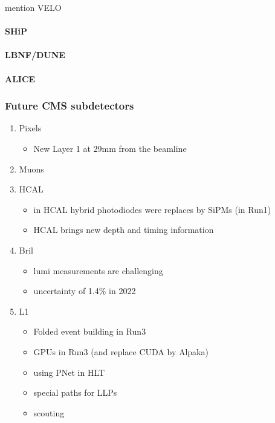 \documentclass[11pt]{article}
\begin{document}
mention VELO

\cite{lhcb_hllhc_tdr,lhcb_hllhc_interest}

\paragraph{SHiP}

\paragraph{LBNF/DUNE}

\paragraph{ALICE}
\subsubsection{Future CMS subdetectors}
\label{sec:org8a7fac8}
\label{sec:hllhc_future_subdetectors.org}
\begin{enumerate}
\item Pixels
\label{sec:orge3f4508}
\begin{itemize}
\item New Layer 1 at 29mm from the beamline
\end{itemize}
\item Muons
\label{sec:orgd4053de}
\item HCAL
\label{sec:orgc5f29ad}
\begin{itemize}
\item in HCAL hybrid photodiodes were replaces by SiPMs (in Run1)
\item HCAL brings new depth and timing information
\end{itemize}
\item Bril
\label{sec:org3b27f7f}
\begin{itemize}
\item lumi measurements are challenging
\item uncertainty of 1.4\% in 2022
\end{itemize}
\item L1
\label{sec:orge8fe0f4}
\begin{itemize}
\item Folded event building in Run3
\item GPUs in Run3 (and replace CUDA by Alpaka)
\item using PNet in HLT
\item special paths for LLPs
\item scouting
\end{itemize}
\end{enumerate}
\end{document}
